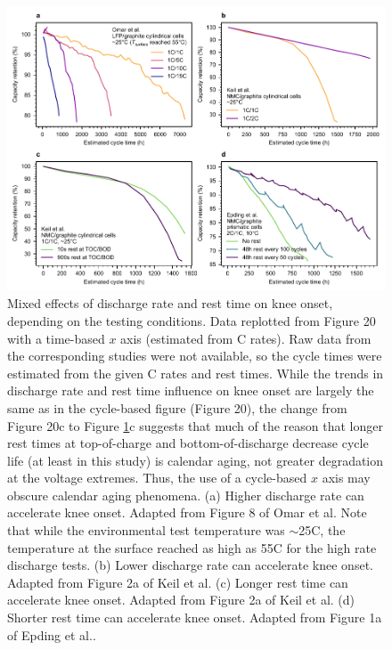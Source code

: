 \documentclass[journal=jpclcd,manuscript=article]{achemso}
\begin{document}
\begin{figure}[ht]
\centering
\includegraphics[scale = 1.0]{final_figures/discharge_rate_rest_time.pdf}
\caption{Mixed effects of discharge rate and rest time on knee onset, depending on the testing conditions.
Data replotted from Figure 20 with a time-based $x$ axis (estimated from C rates).
Raw data from the corresponding studies were not available, so the cycle times were estimated from the given C rates and rest times.
While the trends in discharge rate and rest time influence on knee onset are largely the same as in the cycle-based figure (Figure 20), the change from Figure 20c to Figure \ref{fig:discharge-rest_time}c suggests that much of the reason that longer rest times at top-of-charge and bottom-of-discharge decrease cycle life (at least in this study) is calendar aging, not greater degradation at the voltage extremes.
Thus, the use of a cycle-based $x$ axis may obscure calendar aging phenomena. 
(a) Higher discharge rate can accelerate knee onset. Adapted from Figure 8 of Omar et al.\cite{omar_lithium_2014}
Note that while the environmental test temperature was $\sim$25\degree C, the temperature at the surface reached as high as 55\degree C for the high rate discharge tests.
(b) Lower discharge rate can accelerate knee onset. Adapted from Figure 2a of Keil et al.\cite{keil_linear_2019} (c) Longer rest time can accelerate knee onset. Adapted from  Figure 2a of Keil et al.\cite{keil_linear_2019} (d) Shorter rest time can accelerate knee onset. Adapted from Figure 1a of Epding et al.\cite{epding_investigation_2019}.}
\label{fig:discharge-rest_time}
\end{figure}
\end{document}
